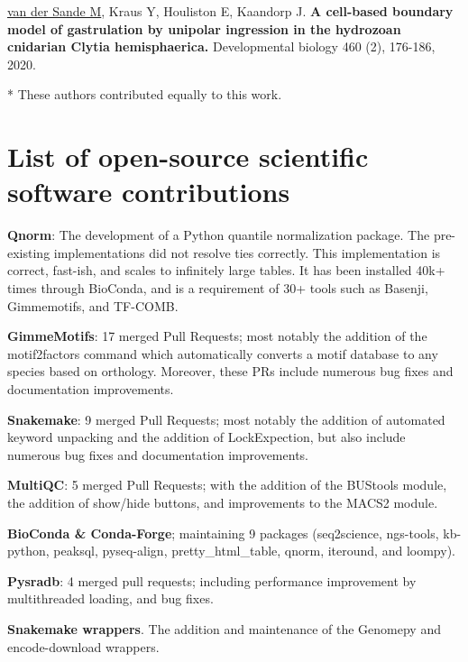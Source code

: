 \noindent
\underline{van der Sande M}, Kraus Y, Houliston E, Kaandorp J. \textbf{A cell-based boundary model of gastrulation by unipolar ingression in the hydrozoan cnidarian Clytia hemisphaerica.}  Developmental biology 460 (2), 176-186, 2020. \cite{vanderSande2020}
\newline

\noindent
* These authors contributed equally to this work.

\newpage
\section{List of open-source scientific software contributions}

\noindent
\textbf{Qnorm}: The development of a Python quantile normalization package. The pre-existing implementations did not resolve ties correctly. This implementation is correct, fast-ish, and scales to infinitely large tables. It has been installed 40k+ times through BioConda, and is a requirement of 30+ tools such as Basenji, Gimmemotifs, and TF-COMB.
\newline

\noindent
\textbf{GimmeMotifs}: 17 merged Pull Requests; most notably the addition of the motif2factors command which automatically converts a motif database to any species based on orthology. Moreover, these PRs include numerous bug fixes and documentation improvements.
\newline

\noindent
\textbf{Snakemake}: 9 merged Pull Requests; most notably the addition of automated keyword unpacking and the addition of LockExpection, but also include numerous bug fixes and documentation improvements.
\newline

\noindent
\textbf{MultiQC}: 5 merged Pull Requests; with the addition of the BUStools module, the addition of show/hide buttons, and improvements to the MACS2 module. 
\newline

\noindent
\textbf{BioConda \& Conda-Forge}; maintaining 9 packages (seq2science, ngs-tools, kb-python, peaksql, pyseq-align, pretty\_html\_table, qnorm, iteround, and loompy).
\newline

\noindent
\textbf{Pysradb}: 4 merged pull requests; including performance improvement by multithreaded loading, and bug fixes.
\newline

\noindent
\textbf{Snakemake wrappers}. The addition and maintenance of the Genomepy and encode-download wrappers.
\newline

